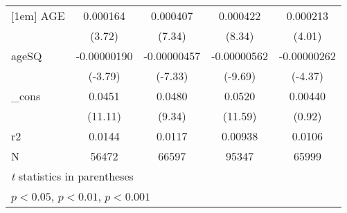 \begin{table}[htbp]
\begin{tabular}{l*{4}{c}}
[1em]
AGE         &    0.000164\sym{***}&    0.000407\sym{***}&    0.000422\sym{***}&    0.000213\sym{***}\\
            &      (3.72)         &      (7.34)         &      (8.34)         &      (4.01)         \\
[1em]
ageSQ       & -0.00000190\sym{***}& -0.00000457\sym{***}& -0.00000562\sym{***}& -0.00000262\sym{***}\\
            &     (-3.79)         &     (-7.33)         &     (-9.69)         &     (-4.37)         \\
[1em]
\_cons      &      0.0451\sym{***}&      0.0480\sym{***}&      0.0520\sym{***}&     0.00440         \\
            &     (11.11)         &      (9.34)         &     (11.59)         &      (0.92)         \\
\hline
r2          &      0.0144         &      0.0117         &     0.00938         &      0.0106         \\
N           &       56472         &       66597         &       95347         &       65999         \\
\hline\hline
\multicolumn{5}{l}{\footnotesize \textit{t} statistics in parentheses}\\
\multicolumn{5}{l}{\footnotesize \sym{*} \(p<0.05\), \sym{**} \(p<0.01\), \sym{***} \(p<0.001\)}\\
\end{tabular}
\end{table}
